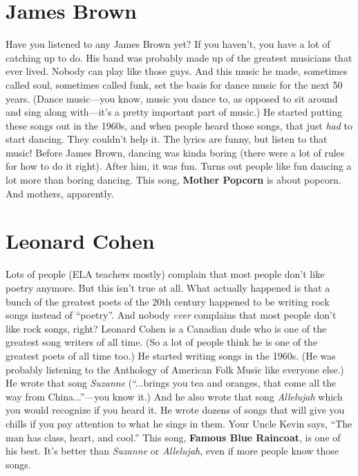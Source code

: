 \documentclass[letterpaper,single]{article}
\begin{document}
\section{James Brown}
Have you listened to any James Brown yet? 
If you haven't, you have a lot of catching up to do. 
His band was probably made up of the greatest musicians that ever lived. 
Nobody can play like those guys. 
And this music he made, sometimes called soul, sometimes called funk, set the basis for dance music for the next 50 years. 
(Dance music---you know, music you dance to, as opposed to sit around and sing along with---it's a pretty important part of music.) 
He started putting these songs out in the 1960s, and when people heard those songs, that just \emph{had} to start dancing. 
They couldn't help it. 
The lyrics are funny, but listen to that music! 
Before James Brown, dancing was kinda boring (there were a lot of rules for how to do it right). 
After him, it was fun. 
Turns out people like fun dancing a lot more than boring dancing.
This song, \textbf{Mother Popcorn} is about popcorn. And mothers, apparently.

\section{Leonard Cohen}
Lots of people (ELA teachers mostly) complain that most people don't like poetry anymore. 
But this isn't true at all. 
What actually happened is that a bunch of the greatest poets of the 20th century happened to be writing rock songs instead of ``poetry''. 
And nobody \emph{ever} complains that most people don't like rock songs, right? 
Leonard Cohen is a Canadian dude who is one of the greatest song writers of all time. 
(So a lot of people think he is one of the greatest poets of all time too.) 
He started writing songs in the 1960s. 
(He was probably listening to the Anthology of American Folk Music like everyone else.) 
He wrote that song \emph{Suzanne} (``...brings you tea and oranges, that come all the way from China...''---you know it.) 
And he also wrote that song \emph{Allelujah} which you would recognize if you heard it. 
He wrote dozens of songs that will give you chills if you pay attention to what he sings in them. 
Your Uncle Kevin says, ``The man has class, heart, and cool.''
This song, \textbf{Famous Blue Raincoat}, is one of his best. 
It's better than \emph{Suzanne} or \emph{Allelujah}, even if more people know those songs.
\end{document}
